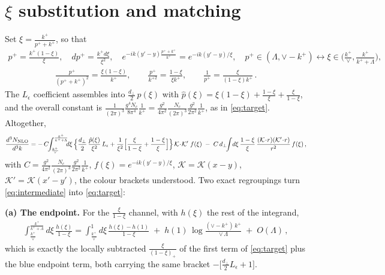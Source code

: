 \documentclass[10pt]{article}
\newcommand{\Leps}{L_{\epsilon}}
\begin{document}
\section{$\xi$ substitution and matching}
Set $\xi=\frac{k^{+}}{p^{+}+k^{+}}$, so that
\begin{align}
p^{+}=\frac{k^{+}(1-\xi)}{\xi},\quad dp^{+}=\frac{k^{+}d\xi}{\xi^{2}},\quad
e^{-ik(y'-y)\frac{p^{+}+k^{+}}{k^{+}}}=e^{-ik(y'-y)/\xi},\quad
p^{+}\in(\Lambda,\vee-k^{+})\leftrightarrow\xi\in\Big(\frac{k^{+}}{\vee},\frac{k^{+}}{k^{+}+\Lambda}\Big),
\end{align}
\begin{align}
\frac{p^{+}}{(p^{+}+k^{+})^{2}}=\frac{\xi(1-\xi)}{k^{+}},\qquad
\frac{p^{+}}{k^{+2}}=\frac{1-\xi}{\xi k^{+}},\qquad
\frac{1}{p^{+}}=\frac{\xi}{(1-\xi)k^{+}}\,.
\end{align}
The $\Leps$ coefficient assembles into
$\frac{d_{\perp}}{2}\,\hat p(\xi)$ with
$\hat p(\xi)=\xi(1-\xi)+\frac{1-\xi}{\xi}+\frac{\xi}{1-\xi}$, and the overall constant is
$\frac{1}{(2\pi)^{3}}\frac{g^{4}N_{c}}{8\pi^{4}}\frac{1}{k^{+}}
=\frac{g^{2}}{4\pi^{2}}\frac{N_{c}}{(2\pi)^{3}}\frac{g^{2}}{2\pi^{2}}\frac{1}{k^{+}}$, as in
\eqref{eq:target}. Altogether,
\begin{align}\label{eq:intermediate}
\frac{d^{3}N_{\rm NLO}}{d^{3}k}
=-\,C\!\!\int_{\frac{k^{+}}{\vee}}^{\frac{k^{+}}{k^{+}+\Lambda}}\!\!\!d\xi\,
\Big\{\frac{d_{\perp}}{2}\,\frac{\hat p(\xi)}{\xi^{2}}\,\Leps
+\frac{1}{\xi^{2}}\Big[\frac{\xi}{1-\xi}+\frac{1-\xi}{\xi}\Big]\Big\}\,
\mathcal K\!\cdot\!\mathcal K'\;f(\xi)
\;-\;C\,d_{\perp}\!\!\int\! d\xi\,\frac{1-\xi}{\xi}\,
\frac{(\mathcal K\!\cdot\! r)(\mathcal K'\!\cdot\! r)}{r^{2}}\,f(\xi)\,,
\end{align}
with $C=\frac{g^{2}}{4\pi^{2}}\frac{N_{c}}{(2\pi)^{3}}\frac{g^{2}}{2\pi^{2}}\frac{1}{k^{+}}$,
$f(\xi)=e^{-ik(y'-y)/\xi}$, $\mathcal K=\mathcal K(x-y)$, $\mathcal K'=\mathcal K(x'-y')$, the colour
brackets understood. Two exact regroupings turn \eqref{eq:intermediate} into \eqref{eq:target}:

\textbf{(a) The endpoint.} For the $\frac{\xi}{1-\xi}$ channel, with $h(\xi)$ the rest of the integrand,
\begin{align}
\int_{\frac{k^{+}}{\vee}}^{\frac{k^{+}}{k^{+}+\Lambda}}\!\!d\xi\,\frac{h(\xi)}{1-\xi}
=\int_{\frac{k^{+}}{\vee}}^{1}\!\!d\xi\,\frac{h(\xi)-h(1)}{1-\xi}
\;+\;h(1)\,\log\frac{(\vee-k^{+})\,k^{+}}{\vee\,\Lambda}\;+\;O(\Lambda)\,,
\end{align}
which is exactly the locally subtracted $\frac{\xi}{(1-\xi)_{+}}$ of the first term of
\eqref{eq:target} plus the blue endpoint term, both carrying the same bracket
$-\big[\frac{d_{\perp}}{2}\Leps+1\big]$.
\end{document}

